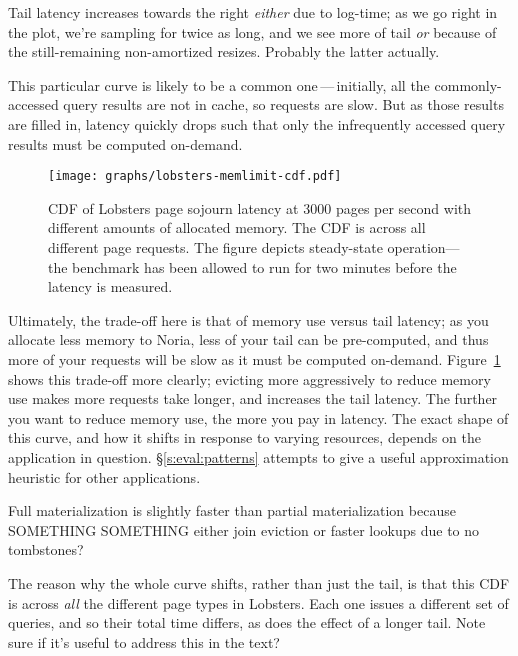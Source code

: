 \begin{inprogress}
  Tail latency increases towards the right \emph{either} due to log-time; as we
  go right in the plot, we're sampling for twice as long, and we see more of
  tail \emph{or} because of the still-remaining non-amortized resizes. Probably
  the latter actually.
\end{inprogress}

This particular curve is likely to be a common one\,---\,initially, all the
commonly-accessed query results are not in cache, so requests are slow. But
as those results are filled in, latency quickly drops such that only the
infrequently accessed query results must be computed on-demand.

\begin{figure}[h]
  \centering
  \texttt{[image: graphs/lobsters-memlimit-cdf.pdf]}
  \caption{CDF of Lobsters page sojourn latency at 3000 pages per second with
  different amounts of allocated memory. The CDF is across all different page
  requests. The figure depicts steady-state operation---the benchmark has been
  allowed to run for two minutes before the latency is measured.}
  \label{f:lobsters-mem-latency}
\end{figure}

Ultimately, the trade-off here is that of memory use versus tail latency; as you
allocate less memory to Noria, less of your tail can be pre-computed, and thus
more of your requests will be slow as it must be computed on-demand.
Figure~\ref{f:lobsters-mem-latency} shows this trade-off more clearly;
evicting more aggressively to reduce memory use makes more requests take longer,
and increases the tail latency. The further you want to reduce memory use, the
more you pay in latency. The exact shape of this curve, and how it shifts in
response to varying resources, depends on the application in question.
\S\ref{s:eval:patterns} attempts to give a useful approximation heuristic for
other applications.

\begin{inprogress}
Full materialization is slightly faster than partial materialization because
SOMETHING SOMETHING either join eviction or faster lookups due to no tombstones?
\end{inprogress}

\begin{inprogress}
The reason why the whole curve shifts, rather than just the tail, is that this
CDF is across \emph{all} the different page types in Lobsters. Each one issues a
different set of queries, and so their total time differs, as does the effect of
a longer tail. Note sure if it's useful to address this in the text?
\end{inprogress}

